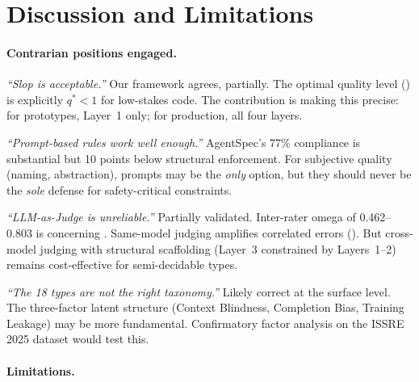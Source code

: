 \documentclass[11pt, a4paper, logo, copyright]{googledeepmind}
\begin{document}
\section{Discussion and Limitations}
\label{sec:discussion}

\paragraph{Contrarian positions engaged.}

\emph{``Slop is acceptable.''} Our framework agrees, partially. The optimal quality level () is explicitly $q^* < 1$ for low-stakes code. The contribution is making this precise: for prototypes, Layer~1 only; for production, all four layers.

\emph{``Prompt-based rules work well enough.''} AgentSpec's 77\% compliance is substantial but 10 points below structural enforcement. For subjective quality (naming, abstraction), prompts may be the \emph{only} option, but they should never be the \emph{sole} defense for safety-critical constraints.

\emph{``LLM-as-Judge is unreliable.''} Partially validated. Inter-rater omega of 0.462--0.803 is concerning \citep{llmjudgetrust2024}. Same-model judging amplifies correlated errors (). But cross-model judging with structural scaffolding (Layer~3 constrained by Layers~1--2) remains cost-effective for semi-decidable types.

\emph{``The 18 types are not the right taxonomy.''} Likely correct at the surface level. The three-factor latent structure (Context Blindness, Completion Bias, Training Leakage) may be more fundamental. Confirmatory factor analysis on the ISSRE 2025 dataset would test this.

\paragraph{Limitations.}
\end{document}
